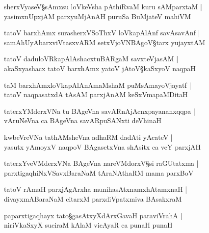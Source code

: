 \begin{shloka}
sherxVyaseV\S sAmxsu loVkeVsha pAthiRvaM kuru sAMparxtaM |\\
yasimxnUpxjAM parxyuMjAnAH puruSa BuMjateV mahiVM 
\end{shloka}

\begin{shloka}
tatoV barxhAmx surasherxVSoThxV loVkapAlAnf savAsavAnf |\\
samAhUyAbarxviVtasxvARM setxVjoVNBAgoV\S tarx yujayxtAM
\end{shloka}

\begin{shloka}
tatoV daduloVRkapAlAshacxtuBARgaM savxteVjasAM |\\
akaSxyashacx tatoV barxhAmx yatoV jAtoV\S kaSxyoV naqpaH 
\end{shloka}

\begin{shloka}
taM barxhAmxloVkapAlAnAmaMshaM puMsAmayoVjayatf |\\
tatoV naqpasatxdA tAsAM parxjAnAM keSxVmapaMDitaH 
\end{shloka}

\begin{shloka}
taterxYMderxVNa tu BAgeVna savARnAjAcnxpayananxqqpa |\\
vAruNeVna ca BAgeVna savAR\R puSANxti deVhinaH 
\end{shloka}

\begin{shloka}
kwbeVreVNa tathAMsheVna adhaRM dadAti yAcateV |\\
yasutx yAmoyxV naqpoV BAgasetxVna shAsitx ca veY parxjAH 
\end{shloka}

\begin{shloka}
taterxYveVMderxVNa BAgeVna nareVMdorxV\S si raGUtatxma |\\
parxtigaqhiNxVSavxBaraNaM tAraNAthaRM mama parxBoV
\end{shloka}

\begin{shloka}
tatoV rAmaH parxjAgArxha munihasAtxnamxhAtamxnaH |\\
divayxmABaraNaM citarxM parxdiVpatxmiva BAsakxraM 
\end{shloka}

\begin{shloka}
paparxtigaqhayx tato\S gasAtxyXdArxGavaH paraviVrahA |\\
niriVkaSxyX suciraM kAlaM vicAyaR ca punaH punaH 
\end{shloka}

